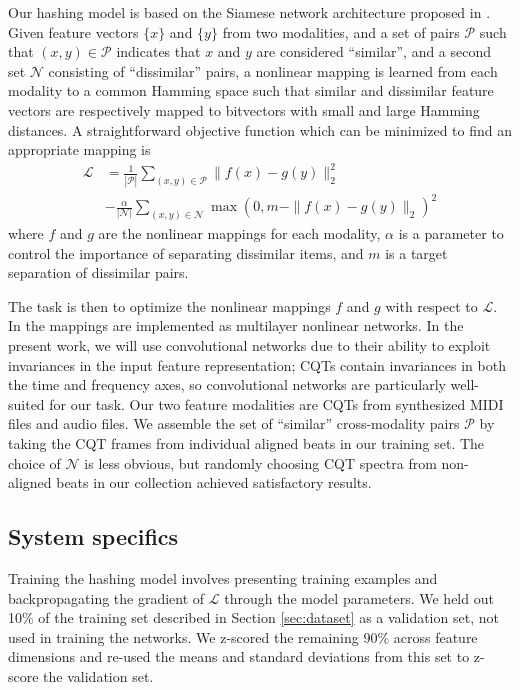 \documentclass{article}
\begin{document}
Our hashing model is based on the Siamese network architecture proposed in \cite{masci2014multimodal}.
Given feature vectors $\{x\}$ and $\{y\}$ from two modalities, and a set of pairs $\mathcal{P}$ such that $(x, y) \in \mathcal{P}$ indicates that $x$ and $y$ are considered ``similar'', and a second set $\mathcal{N}$ consisting of ``dissimilar'' pairs, a nonlinear mapping is learned from each modality to a common Hamming space such that similar and dissimilar feature vectors are respectively mapped to bitvectors with small and large Hamming distances.
A straightforward objective function which can be minimized to find an appropriate mapping is
\begin{align*}
\mathcal{L} &= \frac{1}{|\mathcal{P}|} \sum_{(x, y) \in \mathcal{P}} \| f(x) - g(y) \|_2^2\\
& - \frac{\alpha}{|\mathcal{N}|} \sum_{(x, y) \in \mathcal{N}} \max(0, m - \|f(x) - g(y) \|_2)^2
\end{align*}
where $f$ and $g$ are the nonlinear mappings for each modality, $\alpha$ is a parameter to control the importance of separating dissimilar items, and $m$ is a target separation of dissimilar pairs.

The task is then to optimize the nonlinear mappings $f$ and $g$ with respect to $\mathcal{L}$.
In \cite{masci2014multimodal} the mappings are implemented as multilayer nonlinear networks.
In the present work, we will use convolutional networks due to their ability to exploit invariances in the input feature representation; CQTs contain invariances in both the time and frequency axes, so convolutional networks are particularly well-suited for our task.
Our two feature modalities are CQTs from synthesized MIDI files and audio files.
We assemble the set of ``similar'' cross-modality pairs $\mathcal{P}$ by taking the CQT frames from individual aligned beats in our training set.
The choice of $\mathcal{N}$ is less obvious, but randomly choosing CQT spectra from non-aligned beats in our collection achieved satisfactory results.

\subsection{System specifics}

Training the hashing model involves presenting training examples and backpropagating the gradient of $\mathcal{L}$ through the model parameters.
We held out 10\% of the training set described in Section \ref{sec:dataset} as a validation set, not used in training the networks.
We z-scored the remaining 90\% across feature dimensions and re-used the means and standard deviations from this set to z-score the validation set.
\end{document}
